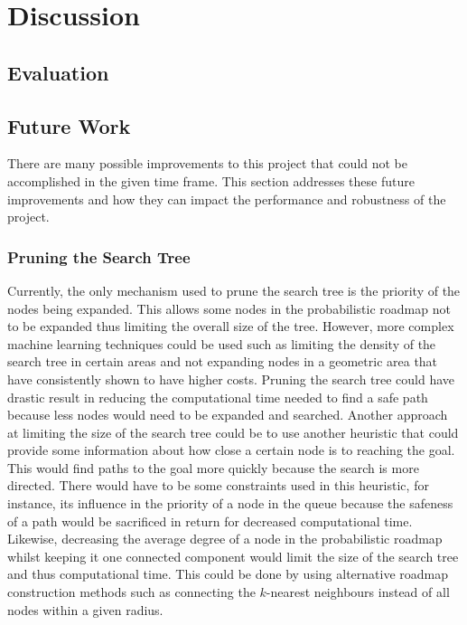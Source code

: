 


\chapter{Discussion}

\label{chapter:discussion}

\section{Evaluation}

\section{Future Work}

There are many possible improvements to this project that could not be
accomplished in the given time frame. This section addresses these future
improvements and how they can impact the performance and robustness of the
project.

\subsection{Pruning the Search Tree}

Currently, the only mechanism used to prune the search tree is the priority of
the nodes being expanded. This allows some nodes in the probabilistic roadmap
not to be expanded thus limiting the overall size of the tree. However, more
complex machine learning techniques could be used such as limiting the density
of the search tree in certain areas and not expanding nodes in a geometric area
that have consistently shown to have higher costs. Pruning the search tree
could have drastic result in reducing the computational time needed to find a
safe path because less nodes would need to be expanded and searched. Another
approach at limiting the size of the search tree could be to use another
heuristic that could provide some information about how close a certain node is
to reaching the goal. This would find paths to the goal more quickly because
the search is more directed. There would have to be some constraints used in
this heuristic, for instance, its influence in the priority of a node in the
queue because the safeness of a path would be sacrificed in return for
decreased computational time. Likewise, decreasing the average degree of a node
in the probabilistic roadmap whilst keeping it one connected component would
limit the size of the search tree and thus computational time. This could be
done by using alternative roadmap construction methods such as connecting the
$k$-nearest neighbours instead of all nodes within a given radius.

